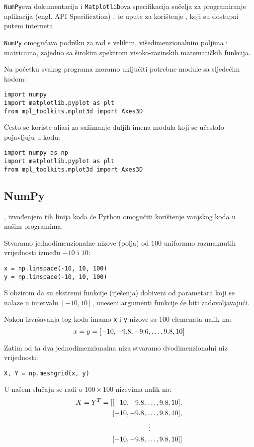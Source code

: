 \verb|NumPy|eva dokumentacija\cite{numpy_doc} i \verb|Matplotlib|ova specifikacija sučelja za programiranje aplikacija (engl. API Specification) \cite{mpl_api}, te upute za korištenje \cite{mpl_ug}, koji su dostupni putem interneta.

\verb|NumPy| omogućava podršku za rad s velikim, višedimenzionalnim poljima i matricama, zajedno sa širokim spektrom visoko-razinskih matematičkih funkcija.\par

Na početku svakog programa moramo uključiti potrebne module sa sljedećim kodom\cite[][naslov 5.4.2. Submodules]{py_lang_ref}:
\begin{verbatim}
import numpy
import matplotlib.pyplot as plt
from mpl_toolkits.mplot3d import Axes3D
\end{verbatim}



Često se koriste aliasi za sažimanje duljih imena modula koji se učestalo pojavljuju u kodu:

\begin{verbatim}
import numpy as np
import matplotlib.pyplot as plt
from mpl_toolkits.mplot3d import Axes3D
\end{verbatim}

\subsection{NumPy}

, izvođenjem tih linija koda će Python omogučiti korištenje vanjskog koda u našim programima.

Stvaramo jednodimenzionalne nizove (polja) od $100$ uniformno razmaknutih vrijednosti između $-10$ i $10$:
\begin{verbatim}
x = np.linspace(-10, 10, 100)
y = np.linspace(-10, 10, 100)
\end{verbatim}
S obzirom da su ekstremi funkcije (rješenja) dobiveni od parametara koji se nalaze u intervalu $[-10, 10]$, uneseni argumenti funkcije će biti zadovoljavajući.\par
Nakon izvršavanja tog koda imamo \verb|x| i \verb|y| nizove sa 100 elemenata nalik na:
$$
    x = y = [-10,\space-9.8,\space-9.6,\dots,\space9.8,\space10]
$$

Zatim od ta dva jednodimenzionalna niza stvaramo dvodimenzionalni niz vrijednosti:
\begin{verbatim}
X, Y = np.meshgrid(x, y)
\end{verbatim}
U našem slučaju se radi o $100\times100$ nizevima nalik na:
\begin{align*}
    X = Y^T = [&[-10,\space-9.8,\dots,\space9.8,\space10],\\
    &[-10,\space-9.8,\dots,\space9.8,\space10],\\
    &\hspace*{0.15\linewidth}\vdots\\
    &[-10,\space-9.8,\dots,\space9.8,\space10]]
\end{align*}

